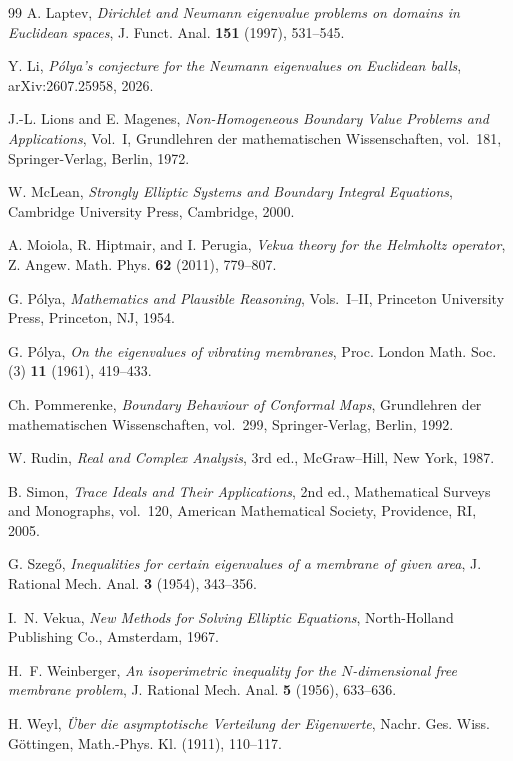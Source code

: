\documentclass[11pt]{amsart}
\numberwithin{equation}{section}
\begin{document}
\begin{thebibliography}{99}
A. Laptev,
\emph{Dirichlet and Neumann eigenvalue problems on domains in Euclidean
spaces}, J. Funct. Anal. \textbf{151} (1997), 531--545.

Y. Li,
\emph{P\'olya's conjecture for the Neumann eigenvalues on Euclidean balls},
arXiv:2607.25958, 2026.

J.-L. Lions and E. Magenes,
\emph{Non-Homogeneous Boundary Value Problems and Applications},
Vol.~I, Grundlehren der mathematischen Wissenschaften, vol.~181,
Springer-Verlag, Berlin, 1972.

W. McLean, \emph{Strongly Elliptic Systems and Boundary Integral Equations},
Cambridge University Press, Cambridge, 2000.

A. Moiola, R. Hiptmair, and I. Perugia,
\emph{Vekua theory for the Helmholtz operator}, Z. Angew. Math. Phys.
\textbf{62} (2011), 779--807.

G. P\'olya, \emph{Mathematics and Plausible Reasoning},
Vols.~I--II, Princeton University Press, Princeton, NJ, 1954.

G. P\'olya, \emph{On the eigenvalues of vibrating membranes},
Proc. London Math. Soc. (3) \textbf{11} (1961), 419--433.

Ch. Pommerenke, \emph{Boundary Behaviour of Conformal Maps},
Grundlehren der mathematischen Wissenschaften, vol.~299,
Springer-Verlag, Berlin, 1992.

W. Rudin, \emph{Real and Complex Analysis}, 3rd ed.,
McGraw--Hill, New York, 1987.

B. Simon, \emph{Trace Ideals and Their Applications}, 2nd ed.,
Mathematical Surveys and Monographs, vol.~120,
American Mathematical Society, Providence, RI, 2005.

G. Szeg\H{o},
\emph{Inequalities for certain eigenvalues of a membrane of given area},
J. Rational Mech. Anal. \textbf{3} (1954), 343--356.

I.~N. Vekua, \emph{New Methods for Solving Elliptic Equations},
North-Holland Publishing Co., Amsterdam, 1967.

H.~F. Weinberger,
\emph{An isoperimetric inequality for the $N$-dimensional free membrane
problem}, J. Rational Mech. Anal. \textbf{5} (1956), 633--636.

H. Weyl, \emph{\"Uber die asymptotische Verteilung der Eigenwerte},
Nachr. Ges. Wiss. G\"ottingen, Math.-Phys. Kl. (1911), 110--117.

\end{thebibliography}
\end{document}
